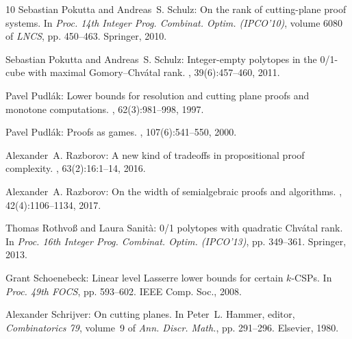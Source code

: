 \begin{thebibliography}{10}
{\sc Sebastian Pokutta and Andreas~S. Schulz}: On the rank of cutting-plane
  proof systems.
\newblock In {\em Proc. 14th Integer Prog. Combinat. Optim. (IPCO'10)}, volume
  6080 of {\em LNCS}, pp. 450--463. Springer, 2010.
\newblock [\epfmtdoi{10.1007/978-3-642-13036-6\_34}]

{\sc Sebastian Pokutta and Andreas~S. Schulz}: Integer-empty polytopes in the
  0/1-cube with maximal {G}omory--{C}hv{\'{a}}tal rank.
, 39(6):457--460, 2011.

{\sc Pavel Pudl{\'{a}}k}: Lower bounds for resolution and cutting plane proofs
  and monotone computations.
, 62(3):981--998, 1997.
\newblock [\epfmtdoi{10.2307/2275583}]

{\sc Pavel Pudl{\'a}k}: Proofs as games.
, 107(6):541--550, 2000.
\newblock [\epfmtdoi{10.1080/00029890.2000.12005233}]

{\sc Alexander~A. Razborov}: A new kind of tradeoffs in propositional proof
  complexity.
, 63(2):16:1--14, 2016.
\newblock [\epfmtdoi{10.1145/2858790}]

{\sc Alexander~A. Razborov}: On the width of semialgebraic proofs and
  algorithms.
, 42(4):1106--1134, 2017.

{\sc Thomas Rothvo{\ss} and Laura Sanit{\`a}}: 0/1 polytopes with quadratic
  {C}hv{\'a}tal rank.
\newblock In {\em Proc. 16th Integer Prog. Combinat. Optim. (IPCO'13)}, pp.
  349--361. Springer, 2013.
\newblock [\epfmtdoi{10.1007/978-3-642-36694-9\_30}]

{\sc Grant Schoenebeck}: Linear level {L}asserre lower bounds for certain
  $k$-{CSPs}.
\newblock In {\em Proc. 49th FOCS}, pp. 593--602. IEEE Comp. Soc., 2008.

{\sc Alexander Schrijver}: On cutting planes.
\newblock In {\sc Peter~L. Hammer}, editor, {\em Combinatorics 79}, volume~9 of
  {\em Ann. Discr. Math.}, pp. 291--296. Elsevier, 1980.
\newblock [\epfmtdoi{10.1016/S0167-5060(08)70085-2}]

\end{thebibliography}